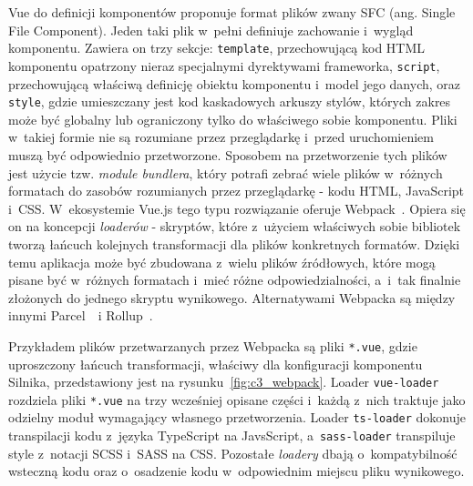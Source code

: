 Vue do definicji komponentów proponuje format plików zwany SFC (ang. Single File Component). Jeden taki plik w~pełni definiuje zachowanie i~wygląd komponentu. Zawiera on trzy sekcje: \texttt{template}, przechowującą kod HTML komponentu opatrzony nieraz specjalnymi dyrektywami frameworka, \texttt{script}, przechowującą właściwą definicję obiektu komponentu i~model jego danych, oraz \texttt{style}, gdzie umieszczany jest kod kaskadowych arkuszy stylów, których zakres może być globalny lub ograniczony tylko do właściwego sobie komponentu. Pliki w~takiej formie nie są rozumiane przez przeglądarkę i~przed uruchomieniem muszą być odpowiednio przetworzone. Sposobem na przetworzenie tych plików jest użycie tzw. \textit{module bundlera}, który potrafi zebrać wiele plików w~różnych formatach do zasobów rozumianych przez przeglądarkę - kodu HTML, JavaScript i~CSS. W~ekosystemie Vue.js tego typu rozwiązanie oferuje \mbox{Webpack~\cite{Webpack}.} Opiera się on na koncepcji \textit{loaderów} - skryptów, które z~użyciem właściwych sobie bibliotek tworzą łańcuch kolejnych transformacji dla plików konkretnych formatów. Dzięki temu aplikacja może być zbudowana z~wielu plików źródłowych, które mogą pisane być w~różnych formatach i~mieć różne odpowiedzialności, a~i~tak finalnie złożonych do jednego skryptu wynikowego. Alternatywami Webpacka są między innymi Parcel~\cite{Parcel}~i Rollup~\cite{Rollup}.

Przykładem plików przetwarzanych przez Webpacka są pliki \texttt{*.vue}, gdzie uproszczony łańcuch transformacji, właściwy dla konfiguracji komponentu Silnika, przedstawiony jest na rysunku~\ref{fig:c3_webpack}. Loader \texttt{vue-loader} rozdziela pliki \texttt{*.vue} na trzy wcześniej opisane części i~każdą z~nich traktuje jako odzielny moduł wymagający własnego przetworzenia. Loader \texttt{ts-loader} dokonuje transpilacji kodu z~języka TypeScript na JavsScript, a~\texttt{sass-loader} transpiluje style z~notacji SCSS i~SASS na CSS. Pozostałe \textit{loadery} dbają o~kompatybilność wsteczną kodu oraz o~osadzenie kodu w~odpowiednim miejscu pliku wynikowego.

